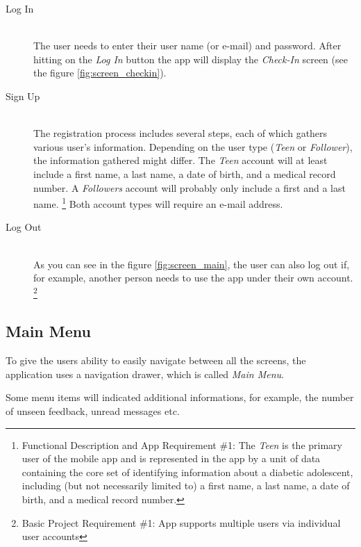 \documentclass{article}
\begin{document}
    \begin{description}
        \item[Log In] \hfill \\
            The user needs to enter their user name (or e-mail) and password. After hitting on the \emph{Log In} button the app will display the \emph{Check-In} screen (see the figure \ref{fig:screen_checkin}).
        \item[Sign Up] \hfill \\
            The registration process includes several steps, each of which gathers various user's information. Depending on the user type (\emph{Teen} or \emph{Follower}), the information gathered might differ. The \emph{Teen} account will at least include a first name, a last name, a date of birth, and a medical record number. A \emph{Followers} account will probably only include a first and a last name.
            \footnote{Functional Description and App Requirement \#1: The \emph{Teen} is the primary user of the mobile app and is represented in the app by a unit of data containing the core set of identifying information about a diabetic adolescent, including (but not necessarily limited to) a first name, a last name, a date of birth, and a medical record number.}
            Both account types will require an e-mail address.
        \item[Log Out] \hfill \\
            As you can see in the figure \ref{fig:screen_main}, the user can also log out if, for example, another person needs to use the app under their own account.
            \footnote{Basic Project Requirement \#1: App supports multiple users via individual user accounts}
    \end{description}

\newpage

    \subsection{Main Menu}

    To give the users ability to easily navigate between all the screens, the application uses a navigation drawer, which is called \emph{Main Menu}.
    
    Some menu items will indicated additional informations, for example, the number of unseen feedback, unread messages etc.
\end{document}
